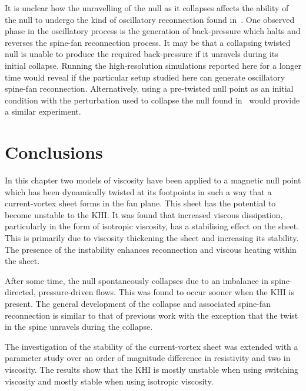 It is unclear how the unravelling of the null as it collapses affects the ability of the null to undergo the kind of oscillatory reconnection found in~\cite{thurgoodThreedimensionalOscillatoryMagnetic2017}. One observed phase in the oscillatory process is the generation of back-pressure which halts and reverses the spine-fan reconnection process. It may be that a collapsing twisted null is unable to produce the required back-pressure if it unravels during its initial collapse. Running the high-resolution simulations reported here for a longer time would reveal if the particular setup studied here can generate oscillatory spine-fan reconnection. Alternatively, using a pre-twisted null point as an initial condition with the perturbation used to collapse the null found in~\cite{thurgoodThreedimensionalOscillatoryMagnetic2017} would provide a similar experiment.

\section{Conclusions}
\label{sec:khi_conclusions}

In this chapter two models of viscosity have been applied to a magnetic null point which has been dynamically twisted at its footpoints in such a way that a current-vortex sheet forms in the fan plane. This sheet has the potential to become unstable to the KHI. It was found that increased viscous dissipation, particularly in the form of isotropic viscosity, has a stabilising effect on the sheet. This is primarily due to viscosity thickening the sheet and increasing its stability. The presence of the instability enhances reconnection and viscous heating within the sheet.

After some time, the null spontaneously collapses due to an imbalance in spine-directed, pressure-driven flows. This was found to occur sooner when the KHI is present. The general development of the collapse and associated spine-fan reconnection is similar to that of previous work with the exception that the twist in the spine unravels during the collapse.

The investigation of the stability of the current-vortex sheet was extended with a parameter study over an order of magnitude difference in resistivity and two in viscosity. The results show that the KHI is mostly unstable when using switching viscosity and mostly stable when using isotropic viscosity.
